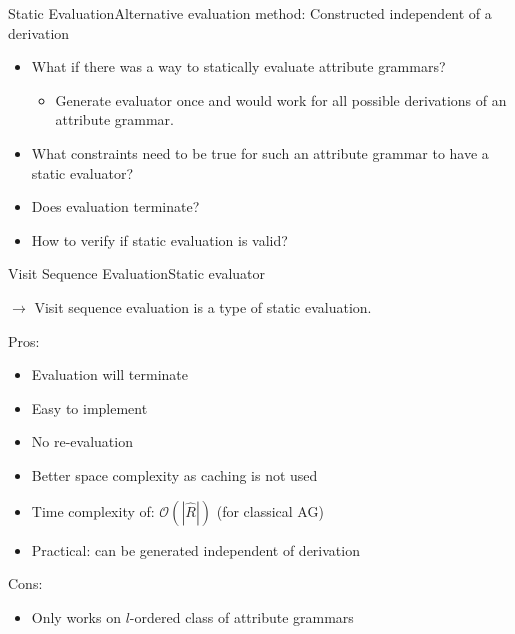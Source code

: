 \begin{frame}{Static Evaluation}{Alternative evaluation method: Constructed independent of a derivation}

\begin{itemize}
    \item What if there was a way to \alert{statically} evaluate attribute grammars?
    \begin{itemize}
        \item Generate evaluator \alert{once} and would \alert{work for all possible derivations} of an attribute grammar.
    \end{itemize}
    \item What \alert{constraints} need to be true for such an attribute grammar to have a static evaluator?
    \item Does evaluation \alert{terminate}?
    \item How to verify if static evaluation is \alert{valid}?
\end{itemize}
\end{frame}



\begin{frame}{Visit Sequence Evaluation}{Static evaluator}

$\to$ \alert{Visit sequence evaluation} is a \alert{type of static evaluation}.

\newlinevspace

Pros:
\begin{itemize}
    \item Evaluation \alert{will terminate}
    \item Easy to implement
    \item \alert{No re-evaluation}
    \item Better space complexity as caching is not used
    \item Time complexity of: $\mathcal{O}(| \hat{R} |)$ (for classical AG)
    \item \alert{Practical}: can be generated independent of derivation
\end{itemize}

Cons:
\begin{itemize}
    \item Only works on \alert{$l$-ordered} class of attribute grammars
\end{itemize}
\end{frame}



